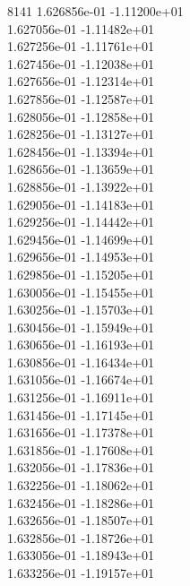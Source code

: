 8141	1.626856e-01	-1.11200e+01	\\ 	1.627056e-01	-1.11482e+01	\\ 	1.627256e-01	-1.11761e+01	\\ 	1.627456e-01	-1.12038e+01	\\ 	1.627656e-01	-1.12314e+01	\\ 	1.627856e-01	-1.12587e+01	\\ 	1.628056e-01	-1.12858e+01	\\ 	1.628256e-01	-1.13127e+01	\\ 	1.628456e-01	-1.13394e+01	\\ 	1.628656e-01	-1.13659e+01	\\ 	1.628856e-01	-1.13922e+01	\\ 	1.629056e-01	-1.14183e+01	\\ 	1.629256e-01	-1.14442e+01	\\ 	1.629456e-01	-1.14699e+01	\\ 	1.629656e-01	-1.14953e+01	\\ 	1.629856e-01	-1.15205e+01	\\ 	1.630056e-01	-1.15455e+01	\\ 	1.630256e-01	-1.15703e+01	\\ 	1.630456e-01	-1.15949e+01	\\ 	1.630656e-01	-1.16193e+01	\\ 	1.630856e-01	-1.16434e+01	\\ 	1.631056e-01	-1.16674e+01	\\ 	1.631256e-01	-1.16911e+01	\\ 	1.631456e-01	-1.17145e+01	\\ 	1.631656e-01	-1.17378e+01	\\ 	1.631856e-01	-1.17608e+01	\\ 	1.632056e-01	-1.17836e+01	\\ 	1.632256e-01	-1.18062e+01	\\ 	1.632456e-01	-1.18286e+01	\\ 	1.632656e-01	-1.18507e+01	\\ 	1.632856e-01	-1.18726e+01	\\ 	1.633056e-01	-1.18943e+01	\\ 	1.633256e-01	-1.19157e+01	\\ \hline
